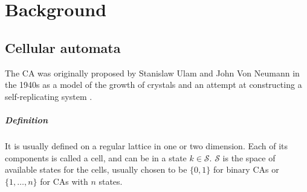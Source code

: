 \chapter{Background}
\label{cha:background}

\section{Cellular automata}\label{sec:cellular-automata-sec}

The \acf{CA} was originally proposed by Stanislaw Ulam and John Von Neumann in
the 1940s as a model of the growth of crystals and an attempt at constructing a
self-replicating system \parencite{vonneumannTheorySelfreproducingAutomata1966}.

\paragraph{Definition}
It is usually defined on a regular lattice in one or two dimension. Each of its
components is called a cell, and can be in a state $k \in \mathcal{S}$. $\mathcal{S}$ is the space of
available states for the cells, usually chosen to be $\{0, 1\}$ for binary
\acp{CA} or $\{1, \ldots, n\}$ for \acp{CA} with $n$ states.


